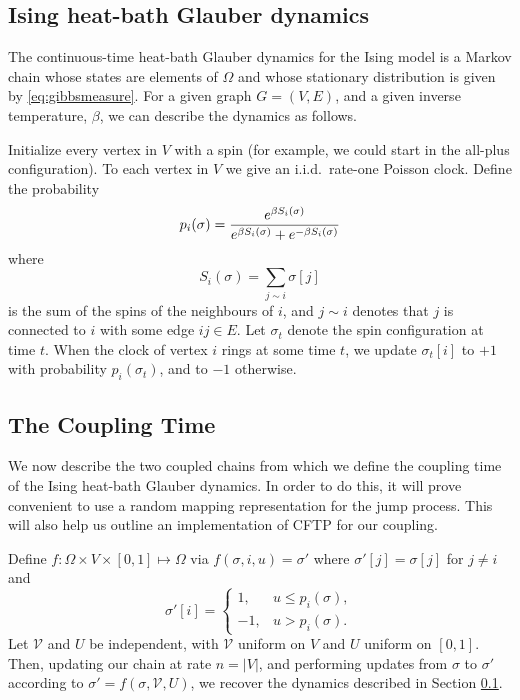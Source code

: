 	\subsection{Ising heat-bath Glauber dynamics}
	\label{sec:heat-bath glauber dynamics definition}
	The continuous-time heat-bath Glauber dynamics for the Ising model is a Markov chain whose states are elements of $\Omega$ and whose stationary distribution is given by \eqref{eq:gibbsmeasure}. For a given graph $G = (V, E)$, and a given inverse temperature, $\beta$, we can describe the dynamics as follows. 

	Initialize every vertex in $V$ with a spin (for example, we could start in the all-plus configuration). To each vertex in $V$ we give an i.i.d.\ rate-one Poisson clock. Define the probability 
	\begin{equation}
		p_i(\sigma) = \frac{e^{\beta S_i(\sigma)}}{e^{\beta S_i(\sigma)} + e^{-\beta S_i(\sigma)}}
		\label{eq:define p_i}
	\end{equation}
	where
	\begin{equation}
		S_i(\sigma) = \sum_{j \sim i} \sigma[j]
	\end{equation}
	is the sum of the spins of the neighbours of $i$, and $j \sim i$ denotes that $j$ is connected to $i$ with some edge $ij \in E$. Let $\sigma_t$ denote the spin configuration at time $t$. When the clock of vertex $i$ rings at some time $t$, we update $\sigma_t[i]$ to $+1$ with probability $p_i(\sigma_t)$, and to $-1$ otherwise.

	\subsection{The Coupling Time}
	\label{sec:the coupling time}
	We now describe the two coupled chains from which we define the coupling time of the Ising heat-bath Glauber dynamics. In order to do this, it will prove convenient to use a random mapping representation for the jump process. This will also help us outline an implementation of CFTP for our coupling.

	Define $f: \Omega \times V \times [0,1] \mapsto \Omega$ via $f(\sigma, i, u) = \sigma'$ where $\sigma'[j] = \sigma[j]$ for $j \neq i$ and
	\begin{equation}
		\sigma'[i] = 
			\begin{cases}
				1, &u \leq p_i(\sigma),\\
				-1, &u > p_i(\sigma).
			\end{cases}
		\label{eq:plusorminusrules}
	\end{equation}
	Let $\mathscr{V}$ and $U$ be independent, with $\mathscr{V}$ uniform on $V$ and $U$ uniform on $[0,1]$. Then, updating our chain at rate $n = |V|$, and performing updates from $\sigma$ to $\sigma'$ according to $\sigma' = f(\sigma, \mathscr{V}, U)$, we recover the dynamics described in Section \ref{sec:heat-bath glauber dynamics definition}.


